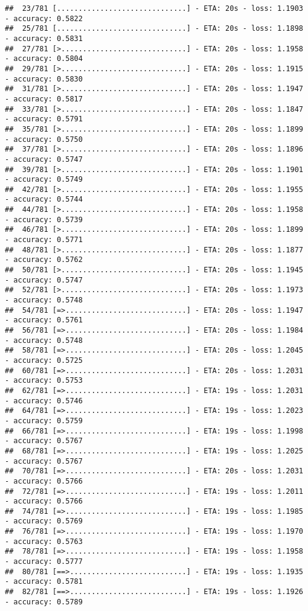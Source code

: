 \documentclass[
]{article}
\begin{document}
\begin{verbatim}
##  23/781 [..............................] - ETA: 20s - loss: 1.1903 - accuracy: 0.5822
##  25/781 [..............................] - ETA: 20s - loss: 1.1898 - accuracy: 0.5831
##  27/781 [>.............................] - ETA: 20s - loss: 1.1958 - accuracy: 0.5804
##  29/781 [>.............................] - ETA: 20s - loss: 1.1915 - accuracy: 0.5830
##  31/781 [>.............................] - ETA: 20s - loss: 1.1947 - accuracy: 0.5817
##  33/781 [>.............................] - ETA: 20s - loss: 1.1847 - accuracy: 0.5791
##  35/781 [>.............................] - ETA: 20s - loss: 1.1899 - accuracy: 0.5750
##  37/781 [>.............................] - ETA: 20s - loss: 1.1896 - accuracy: 0.5747
##  39/781 [>.............................] - ETA: 20s - loss: 1.1901 - accuracy: 0.5749
##  42/781 [>.............................] - ETA: 20s - loss: 1.1955 - accuracy: 0.5744
##  44/781 [>.............................] - ETA: 20s - loss: 1.1958 - accuracy: 0.5739
##  46/781 [>.............................] - ETA: 20s - loss: 1.1899 - accuracy: 0.5771
##  48/781 [>.............................] - ETA: 20s - loss: 1.1877 - accuracy: 0.5762
##  50/781 [>.............................] - ETA: 20s - loss: 1.1945 - accuracy: 0.5747
##  52/781 [>.............................] - ETA: 20s - loss: 1.1973 - accuracy: 0.5748
##  54/781 [=>............................] - ETA: 20s - loss: 1.1947 - accuracy: 0.5761
##  56/781 [=>............................] - ETA: 20s - loss: 1.1984 - accuracy: 0.5748
##  58/781 [=>............................] - ETA: 20s - loss: 1.2045 - accuracy: 0.5725
##  60/781 [=>............................] - ETA: 20s - loss: 1.2031 - accuracy: 0.5753
##  62/781 [=>............................] - ETA: 19s - loss: 1.2031 - accuracy: 0.5746
##  64/781 [=>............................] - ETA: 19s - loss: 1.2023 - accuracy: 0.5759
##  66/781 [=>............................] - ETA: 19s - loss: 1.1998 - accuracy: 0.5767
##  68/781 [=>............................] - ETA: 19s - loss: 1.2025 - accuracy: 0.5767
##  70/781 [=>............................] - ETA: 20s - loss: 1.2031 - accuracy: 0.5766
##  72/781 [=>............................] - ETA: 19s - loss: 1.2011 - accuracy: 0.5766
##  74/781 [=>............................] - ETA: 19s - loss: 1.1985 - accuracy: 0.5769
##  76/781 [=>............................] - ETA: 19s - loss: 1.1970 - accuracy: 0.5763
##  78/781 [=>............................] - ETA: 19s - loss: 1.1958 - accuracy: 0.5777
##  80/781 [==>...........................] - ETA: 19s - loss: 1.1935 - accuracy: 0.5781
##  82/781 [==>...........................] - ETA: 19s - loss: 1.1926 - accuracy: 0.5789

\end{verbatim}
\end{document}
